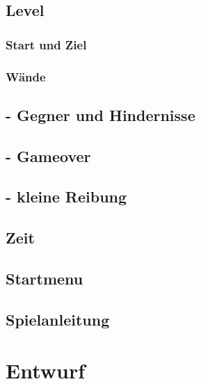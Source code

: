 \documentclass[12pt,a4paper]{scrartcl}
\begin{document}
\subsection{Level}
\subsubsection{Start und Ziel}

\subsubsection{Wände}

\subsection{- Gegner und Hindernisse}

\subsection{- Gameover}

\subsection{- kleine Reibung}

\subsection{Zeit}

\subsection{Startmenu}

\subsection{Spielanleitung}


\clearpage
\newpage
\section{Entwurf}
\end{document}
